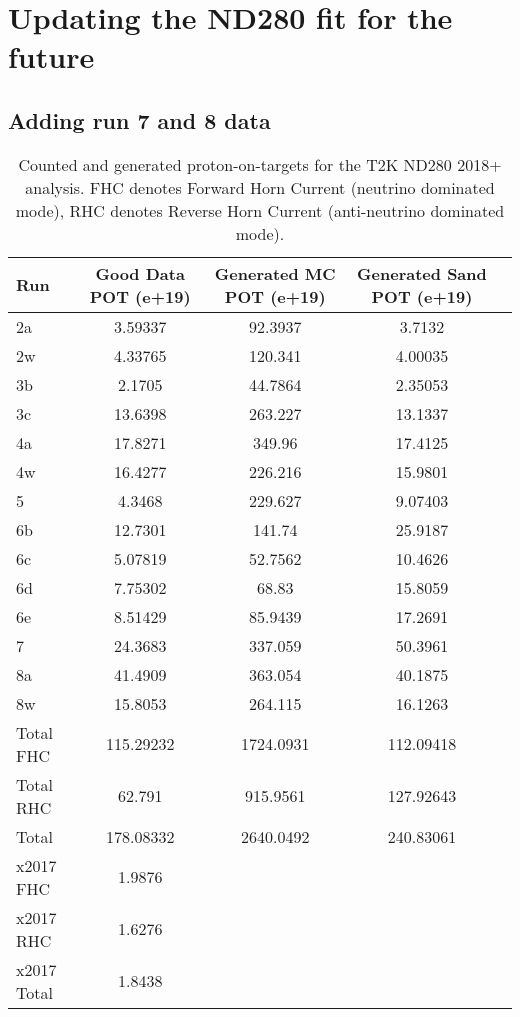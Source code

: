 \chapter{Updating the ND280 fit for the future}

\section{Adding run 7 and 8 data}

\begin{table}[htbp]
	\centering
	\begin{tabular}{ l c c c c }
		\hline
		Run & Good Data POT (e+19) & Generated MC POT (e+19) & Generated Sand POT (e+19) \\
		\hline
		\hline
		2a  & 3.59337    & 92.3937     & 3.7132  \\
		2w  & 4.33765    & 120.341     & 4.00035 \\
		\hline
		3b  & 2.1705     & 44.7864     & 2.35053 \\
		3c  & 13.6398    & 263.227     & 13.1337 \\
		\hline
		4a  & 17.8271    & 349.96      & 17.4125 \\
		4w  & 16.4277    & 226.216     & 15.9801 \\
		\hline
		5   & 4.3468     & 229.627     & 9.07403 \\
		\hline
		6b  & 12.7301    & 141.74      & 25.9187 \\
		6c  & 5.07819    & 52.7562     & 10.4626 \\
		6d  & 7.75302    & 68.83       & 15.8059 \\
		6e  & 8.51429    & 85.9439     & 17.2691 \\
		\hline
		7   & 24.3683	 & 337.059     & 50.3961 \\
		\hline
		8a  & 41.4909	 & 363.054	   & 40.1875 \\
		8w  & 15.8053    & 264.115 	   & 16.1263 \\
		\hline
		Total FHC & 115.29232 & 1724.0931 &  112.09418 \\
		Total RHC & 62.791 	  & 915.9561  &  127.92643 \\
		Total 	  & 178.08332 & 2640.0492 &  240.83061 \\
		\hline
		x2017 FHC   & 1.9876 \\
		x2017 RHC   & 1.6276 \\
		x2017 Total & 1.8438 \\
	\end{tabular}
	\caption{Counted and generated proton-on-targets for the T2K ND280 2018+ analysis. FHC denotes Forward Horn Current (neutrino dominated mode), RHC denotes Reverse Horn Current (anti-neutrino dominated mode).}
	\label{tab:pot_2017}
\end{table}


